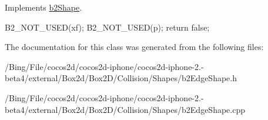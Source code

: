 Implements \hyperlink{classb2_shape_a6ac968e403e2d93e8ae46d728a2e50fa}{b2\-Shape}.


\begin{DoxyCode}
{
        B2_NOT_USED(xf);
        B2_NOT_USED(p);
        return false;
}
\end{DoxyCode}


The documentation for this class was generated from the following files\-:\begin{DoxyCompactItemize}
\item 
/\-Bing/\-File/cocos2d/cocos2d-\/iphone/cocos2d-\/iphone-\/2.-\/beta4/external/\-Box2d/\-Box2\-D/\-Collision/\-Shapes/b2\-Edge\-Shape.\-h\item 
/\-Bing/\-File/cocos2d/cocos2d-\/iphone/cocos2d-\/iphone-\/2.-\/beta4/external/\-Box2d/\-Box2\-D/\-Collision/\-Shapes/b2\-Edge\-Shape.\-cpp\end{DoxyCompactItemize}
